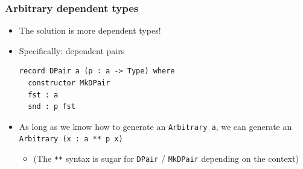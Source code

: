 \documentclass[compress,handout]{beamer}
\begin{document}
\begin{frame}[fragile]
  \frametitle{Arbitrary dependent types}

  \begin{itemize}
    \item<1-> The solution is more dependent types!
    \item<2-> Specifically: dependent pairs

    \begin{verbatim}
record DPair a (p : a -> Type) where
  constructor MkDPair
  fst : a
  snd : p fst
    \end{verbatim}

    \item<3-> As long as we know how to generate an {\textasciigrave
              \texttt{Arbitrary a}\textasciigrave}, we can generate an
              {\textasciigrave\texttt{Arbitrary (x : a ** p x)}\textasciigrave}
    \begin{itemize}
      \item<3-> (The \texttt{**} syntax is sugar for
                \texttt{DPair} / \texttt{MkDPair}
                depending on the context)
    \end{itemize}
  \end{itemize}

\end{frame}


\end{document}
